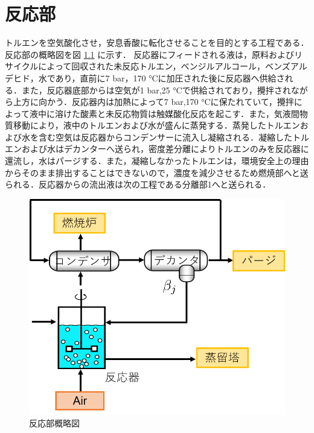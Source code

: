 \documentclass[a4j]{jsreport}
\begin{document}
\newpage
\chapter{反応部}
トルエンを空気酸化させ，安息香酸に転化させることを目的とする工程である．
反応部の概略図を図 \ref{反応部設計結果の概略図} に示す．
反応器にフィードされる液は，原料およびリサイクルによって回収された未反応トルエン，ベンジルアルコール，ベンズアルデヒド，水であり，直前に7 \si{\bar}，170 \si{\degreeCelsius}に加圧された後に反応器へ供給される．また，反応器底部からは空気が1 \si{\bar},25 \si{\degreeCelsius}で供給されており，攪拌されながら上方に向かう．反応器内は加熱によって7 \si{\bar},170 \si{\degreeCelsius}に保たれていて，攪拌によって液中に溶けた酸素と未反応物質は触媒酸化反応を起こす．また，気液間物質移動により，液中のトルエンおよび水が盛んに蒸発する．蒸発したトルエンおよび水を含む空気は反応器からコンデンサーに流入し凝縮される．凝縮したトルエンおよび水はデカンターへ送られ，密度差分離によりトルエンのみを反応器に還流し，水はパージする．また，凝縮しなかったトルエンは，環境安全上の理由からそのまま排出することはできないので，濃度を減少させるため燃焼部へと送られる．反応器からの流出液は次の工程である分離部1へと送られる．
\begin{figure}[htbp]
  \centering
  \includegraphics[scale=0.7]{ReactionSection.png}
  \caption{反応部概略図}
  \label{反応部設計結果の概略図}
\end{figure}
\end{document}
